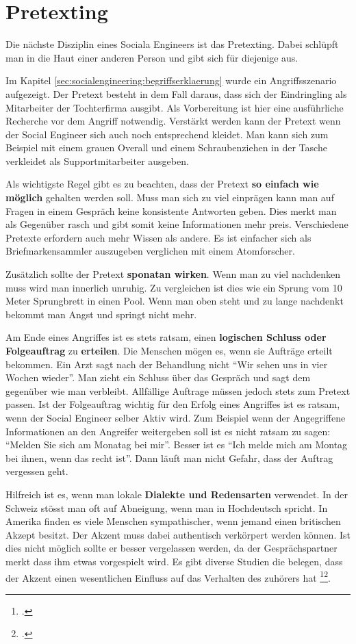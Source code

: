 \section{Pretexting}
Die nächste Disziplin eines Sociala Engineers ist das Pretexting. Dabei schlüpft man in die Haut einer anderen Person und gibt sich für diejenige aus.

Im Kapitel \cref{sec:socialengineering:begriffserklaerung} wurde ein Angriffsszenario aufgezeigt. Der Pretext besteht in dem Fall daraus, dass sich der Eindringling als Mitarbeiter der Tochterfirma ausgibt. Als Vorbereitung ist hier eine ausführliche Recherche vor dem Angriff notwendig. Verstärkt werden kann der Pretext wenn der Social Engineer sich auch noch entsprechend kleidet. Man kann sich zum Beispiel mit einem grauen Overall und einem Schraubenziehen in der Tasche verkleidet als Supportmitarbeiter ausgeben.

Als wichtigste Regel gibt es zu beachten, dass der Pretext \textbf{so einfach wie möglich} gehalten werden soll. Muss man sich zu viel einprägen kann man auf Fragen in einem Gespräch keine konsistente Antworten geben. Dies merkt man als Gegenüber rasch und gibt somit keine Informationen mehr preis. Verschiedene Pretexte erfordern auch mehr Wissen als andere. Es ist einfacher sich als Briefmarkensammler auszugeben verglichen mit einem Atomforscher. 

Zusätzlich sollte der Pretext \textbf{sponatan wirken}. Wenn man zu viel nachdenken muss wird man innerlich unruhig. Zu vergleichen ist dies wie ein Sprung vom 10 Meter Sprungbrett in einen Pool. Wenn man oben steht und zu lange nachdenkt bekommt man Angst und springt nicht mehr.

Am Ende eines Angriffes ist es stets ratsam, einen \textbf{logischen Schluss oder Folgeauftrag} zu \textbf{erteilen}. Die Menschen mögen es, wenn sie Aufträge erteilt bekommen. Ein Arzt sagt nach der Behandlung nicht "`Wir sehen uns in vier Wochen wieder"'. Man zieht ein Schluss über das Gespräch und sagt dem gegenüber wie man verbleibt. Allfällige Auftrage müssen jedoch stets zum Pretext passen. Ist der Folgeauftrag wichtig für den Erfolg eines Angriffes ist es ratsam, wenn der Social Engineer selber Aktiv wird. Zum Beispiel wenn der Angegriffene Informationen an den Angreifer weitergeben soll ist es nicht ratsam zu sagen: "`Melden Sie sich am Monatag bei mir"'. Besser ist es "`Ich melde mich am Montag bei ihnen, wenn das recht ist"'. Dann läuft man nicht Gefahr, dass der Auftrag vergessen geht.

Hilfreich ist es, wenn man lokale \textbf{Dialekte und Redensarten} verwendet. In der Schweiz stösst man oft auf Abneigung, wenn man in Hochdeutsch spricht. In Amerika finden es viele Menschen sympathischer, wenn jemand einen britischen Akzept besitzt. Der Akzent muss dabei authentisch verkörpert werden können. Ist dies nicht möglich sollte er besser vergelassen werden, da der Gesprächspartner merkt dass ihm etwas vorgespielt wird. Es gibt diverse Studien die belegen, dass der Akzent einen wesentlichen Einfluss auf das Verhalten des zuhörers hat \footcite{Journal_of_Targeting_Measurement_and_Analysis_for_Marketing_2015-05-14}\footcite{The_Effect_of_Perceived_Regional_Accents_on_Individual_Economic_Behavior_2015-05-14}.

